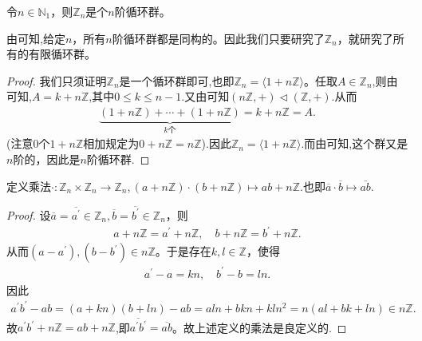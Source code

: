 \documentclass[../../main.tex]{subfiles}
\begin{document}
\begin{proposition}
令$n \in \mathbb{N}_1$，则$\mathbb{Z}_n$是个$n$阶循环群。  
\end{proposition}
\begin{note}
由可知,给定$n$，所有$n$阶循环群都是同构的。因此我们只要研究了$\mathbb{Z}_n$，就研究了所有的有限循环群。 
\end{note}
\begin{proof}
我们只须证明$\mathbb{Z}_n $是一个循环群即可,也即$\mathbb{Z}_n = \langle 1 + n\mathbb{Z} \rangle$。任取$A\in \mathbb{Z}_n$,则由可知,$A=k+n\mathbb{Z}$,其中$0\leqslant  k\leqslant  n-1$.又由可知$(n\mathbb{Z},+)\lhd (\mathbb{Z},+)$.从而
\begin{align*}
\underset{k\text{个}}{\underbrace{\left( 1+n\mathbb{Z} \right) +\cdots +\left( 1+n\mathbb{Z} \right) }}=k+n\mathbb{Z} =A.
\end{align*}
(注意$0$个$1 + n\mathbb{Z}$相加规定为$0 + n\mathbb{Z} = n\mathbb{Z}$).因此$\mathbb{Z}_n = \langle 1 + n\mathbb{Z} \rangle$.而由可知,这个群又是$n$阶的，因此是$n$阶循环群.

\end{proof}

\begin{definition}
定义乘法$\cdot: \mathbb{Z}_n \times \mathbb{Z}_n \to \mathbb{Z}_n$,$\, (a + n\mathbb{Z}) \cdot (b + n\mathbb{Z}) \mapsto ab + n\mathbb{Z}.$也即$\overline{a}\cdot \overline{b}\mapsto \overline{ab}.$
\end{definition}
\begin{proof}
设$\overline{a} = \overline{a^\prime} \in \mathbb{Z}_n, \overline{b} = \overline{b^\prime} \in \mathbb{Z}_n$，则
\begin{align*}
a + n\mathbb{Z} = a^\prime + n\mathbb{Z}, \quad b + n\mathbb{Z} = b^\prime + n\mathbb{Z}.
\end{align*}
从而$(a - a^\prime), (b - b^\prime) \in n\mathbb{Z}$。于是存在$k, l \in \mathbb{Z}$，使得
\begin{align*}
a^\prime - a = kn, \quad b^\prime - b = ln.
\end{align*}
因此
\begin{align*}
a^\prime b^\prime - ab = (a + kn)(b + ln) - ab 
= aln + bkn + kln^2 
= n(al + bk + ln) \in n\mathbb{Z}.
\end{align*}
故$a^\prime b^\prime + n\mathbb{Z} = ab + n\mathbb{Z}$,即$\overline{a^\prime b^\prime} = \overline{ab}$。故上述定义的乘法是良定义的.

\end{proof}
\end{document}

